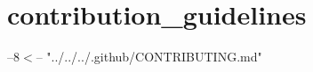 \chapter{contribution\+\_\+guidelines }
\hypertarget{md_include_2nlohman_2json-develop_2docs_2mkdocs_2docs_2community_2contribution__guidelines}{}\label{md_include_2nlohman_2json-develop_2docs_2mkdocs_2docs_2community_2contribution__guidelines}
--8\texorpdfstring{$<$}{<}-- "{}../\+../\+../\+.\+github/\+\+CONTRIBUTING.\+md"{} 